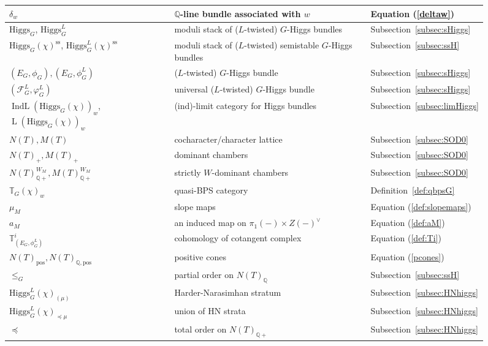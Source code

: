 \documentclass [11pt,oneside,a4paper,mathscr]{amsart}
\theoremstyle{definition}
\renewcommand{\leq}{\leqslant}
\newcommand{\LL}{\operatorname{L}}
\newcommand{\IndL}{\operatorname{IndL}}
\newcommand{\Hig}{\mathrm{Higgs}}
\begin{document}
\begin{figure}
{\begin{tabular}{|l|l|l|}
\\ \hline
$\delta_w$ & $\mathbb{Q}$-line bundle associated with $w$ & Equation (\ref{deltaw})
\\ \hline
$\Hig_G$, $\Hig_G^{L}$ & moduli stack of ($L$-twisted) $G$-Higgs bundles & Subsection~\ref{subsec:sHiggs}
\\ \hline
$\Hig_G(\chi)^{\mathrm{ss}}$, $\Hig_G^{L}(\chi)^{\mathrm{ss}}$ & moduli stack of ($L$-twisted) semistable $G$-Higgs bundles & Subsection~\ref{subsec:ssH}
\\ \hline
$(E_G, \phi_G), (E_G, \phi_G^{L})$ & ($L$-twisted) $G$-Higgs bundle & Subsection~\ref{subsec:sHiggs}
\\ \hline
$(\mathscr{F}_G^{L}, \varphi_G^{L})$ & universal ($L$-twisted) $G$-Higgs bundle & Subsection~\ref{subsec:sHiggs}
\\ \hline
$\IndL(\Hig_G(\chi))_w$, $\LL(\Hig_G(\chi))_w$ & (ind)-limit category for Higgs bundles & Subsection~\ref{subsec:limHiggs}
\\ \hline
$N(T), M(T)$ &cocharacter/character lattice & Subsection~\ref{subsec:SOD0}
\\ \hline
$N(T)_{+}, M(T)_{+}$ & dominant chambers & Subsection~\ref{subsec:SOD0}
\\ \hline
$N(T)_{\mathbb{Q}+}^{W_M}, M(T)_{\mathbb{Q}+}^{W_M}$ & strictly $W$-dominant chambers & Subsection~\ref{subsec:SOD0}
\\ \hline
$\mathbb{T}_{G}(\chi)_w$ & quasi-BPS category & Definition~\ref{def:qbpsG}
\\ \hline
$\mu_M$ & slope maps & Equation (\ref{def:slopemaps})
\\ \hline
$a_M$ & an induced map on $\pi_1(-)\times Z(-)^{\vee}$ & Equation (\ref{def:aM})
\\ \hline
$\mathbb{T}^i_{(E_G, \phi_G^{L})}$ & cohomology of cotangent complex & Equation (\ref{def:Ti})
\\ \hline
$N(T)_{\mathrm{pos}}, N(T)_{\mathbb{Q}, \mathrm{pos}}$ & positive cones & Equation (\ref{pcones})
\\ \hline
$\leq_G$ & partial order on $N(T)_{\mathbb{Q}}$ & Subsection~\ref{subsec:ssH}
\\ \hline
$\Hig_G^{L}(\chi)_{(\mu)}$ & Harder-Narasimhan stratum & Subsection~\ref{subsec:HNhiggs}
\\ \hline
$\Hig_G^{L}(\chi)_{\preceq \mu}$ & union of HN strata & Subsection~\ref{subsec:HNhiggs}
\\ \hline
$\preceq$ & total order on $N(T)_{\mathbb{Q}+}$ & Subsection~\ref{subsec:HNhiggs}
\\ \hline

\end{tabular}}
\end{figure}
\end{document}
